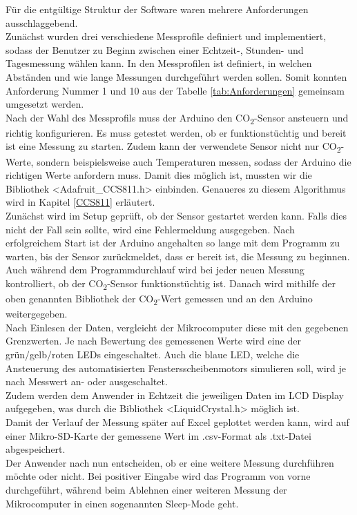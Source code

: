 \label{Softwaremplementation}



Für die entgültige Struktur der Software waren mehrere Anforderungen ausschlaggebend. \\
Zunächst wurden drei verschiedene Messprofile definiert und implementiert, sodass der Benutzer zu Beginn zwischen einer Echtzeit-, Stunden- und Tagesmessung wählen kann. In den Messprofilen ist definiert, in welchen Abständen und wie lange Messungen durchgeführt werden sollen. Somit konnten Anforderung Nummer 1 und 10 aus der Tabelle \ref{tab:Anforderungen} gemeinsam umgesetzt werden. \\
Nach der Wahl des Messprofils muss der Arduino den CO\textsubscript{2}-Sensor ansteuern und richtig konfigurieren. Es muss getestet werden, ob er funktionstüchtig und bereit ist eine Messung zu starten. Zudem kann der verwendete Sensor nicht nur CO\textsubscript{2}-Werte, sondern beispielsweise auch Temperaturen messen, sodass der Arduino die richtigen Werte anfordern muss. Damit dies möglich ist, mussten wir die Bibliothek <Adafruit\_CCS811.h> einbinden. Genaueres zu diesem Algorithmus wird in Kapitel \ref{CCS811} erläutert. \\
Zunächst wird im Setup geprüft, ob der Sensor gestartet werden kann. Falls dies nicht der Fall sein sollte, wird eine Fehlermeldung ausgegeben. Nach erfolgreichem Start ist der Arduino angehalten so lange mit dem Programm zu warten, bis der Sensor zurückmeldet, dass er bereit ist, die Messung zu beginnen. \\
Auch während dem Programmdurchlauf wird bei jeder neuen Messung kontrolliert, ob der CO\textsubscript{2}-Sensor funktionstüchtig ist. Danach wird mithilfe der oben genannten Bibliothek der CO\textsubscript{2}-Wert gemessen und an den Arduino weitergegeben. \\
Nach Einlesen der Daten, vergleicht der Mikrocomputer diese mit den gegebenen Grenzwerten. Je nach Bewertung des gemessenen Werte wird eine der grün/gelb/roten LEDs eingeschaltet. Auch die blaue LED, welche die Ansteuerung des automatisierten Fenstersscheibenmotors simulieren soll, wird je nach Messwert an- oder ausgeschaltet. \\
Zudem werden dem Anwender in Echtzeit die jeweiligen Daten im LCD Display aufgegeben, was durch die Bibliothek <LiquidCrystal.h> möglich ist. \\
Damit der Verlauf der Messung später auf Excel geplottet werden kann, wird auf einer Mikro-SD-Karte der gemessene Wert im .csv-Format als .txt-Datei abgespeichert. \\ %
Der Anwender nach nun entscheiden, ob er eine weitere Messung durchführen möchte oder nicht. Bei positiver Eingabe wird das Programm von vorne durchgeführt, während beim Ablehnen einer weiteren Messung der Mikrocomputer in einen sogenannten Sleep-Mode geht. %



